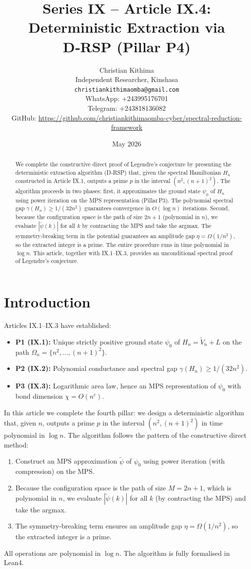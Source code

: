 \documentclass[11pt,a4paper]{article}
\title{Series IX – Article IX.4: Deterministic Extraction via D‑RSP (Pillar P4)}
\author{Christian Kithima \\
Independent Researcher, Kinshasa \\
\texttt{christiankithimaomba@gmail.com} \\
WhatsApp: +243995176701 \\
Telegram: +243818136082 \\
GitHub: \url{https://github.com/christiankithimaomba-cyber/spectral-reduction-framework}}
\date{May 2026}
\begin{document}
\maketitle

\begin{abstract}
We complete the constructive direct proof of Legendre's conjecture by presenting the deterministic extraction algorithm (D‑RSP) that, given the spectral Hamiltonian \(H_n\) constructed in Article IX.1, outputs a prime \(p\) in the interval \((n^2, (n+1)^2)\). The algorithm proceeds in two phases: first, it approximates the ground state \(\psi_0\) of \(H_n\) using power iteration on the MPS representation (Pillar P3). The polynomial spectral gap \(\gamma(H_n) \ge 1/(32n^2)\) guarantees convergence in \(O(\log n)\) iterations. Second, because the configuration space is the path of size \(2n+1\) (polynomial in \(n\)), we evaluate \(|\tilde{\psi}(k)|\) for all \(k\) by contracting the MPS and take the argmax. The symmetry‑breaking term in the potential guarantees an amplitude gap \(\eta = \Omega(1/n^2)\), so the extracted integer is a prime. The entire procedure runs in time polynomial in \(\log n\). This article, together with IX.1–IX.3, provides an unconditional spectral proof of Legendre's conjecture.
\end{abstract}

\tableofcontents

\section{Introduction}

Articles IX.1–IX.3 have established:
\begin{itemize}
\item \textbf{P1 (IX.1):} Unique strictly positive ground state \(\psi_0\) of \(H_n = \tilde{V}_n + L\) on the path \(\Omega_n = \{n^2, \dots, (n+1)^2\}\).
\item \textbf{P2 (IX.2):} Polynomial conductance and spectral gap \(\gamma(H_n) \ge 1/(32n^2)\).
\item \textbf{P3 (IX.3):} Logarithmic area law, hence an MPS representation of \(\psi_0\) with bond dimension \(\chi = O(n^c)\).
\end{itemize}
In this article we complete the fourth pillar: we design a deterministic algorithm that, given \(n\), outputs a prime \(p\) in the interval \((n^2, (n+1)^2)\) in time polynomial in \(\log n\). The algorithm follows the pattern of the constructive direct method:
\begin{enumerate}
\item Construct an MPS approximation \(\tilde{\psi}\) of \(\psi_0\) using power iteration (with compression) on the MPS.
\item Because the configuration space is the path of size \(M = 2n+1\), which is polynomial in \(n\), we evaluate \(|\tilde{\psi}(k)|\) for all \(k\) (by contracting the MPS) and take the argmax.
\item The symmetry‑breaking term ensures an amplitude gap \(\eta = \Omega(1/n^2)\), so the extracted integer is a prime.
\end{enumerate}
All operations are polynomial in \(\log n\). The algorithm is fully formalised in Lean4.
\end{document}
